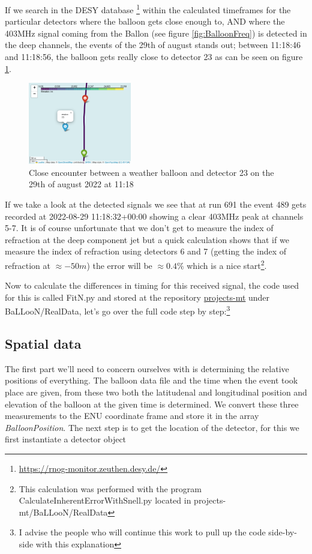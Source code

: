\documentclass[11pt,a4paper,faculty=we,language=en,doctype=report]{cls/ugent-doc}
\begin{document}
If we search in the DESY database
\footnote{\url{https://rnog-monitor.zeuthen.desy.de/}} within the calculated
timeframes for the particular detectors where the balloon gets close enough to,
AND where the 403MHz signal coming from the Ballon (see figure
\ref{fig:BalloonFreq}) is detected in the deep channels, the events of the 29th
of august stands out; between 11:18:46 and 11:18:56, the balloon gets really
close to detector 23 as can be seen on figure \ref{fig:29/08/22}.
\begin{figure}
	\centering
	\includegraphics[width=0.4\textwidth]{29-08-Encounter.png}
	\caption{Close encounter between a weather balloon and detector 23 on the 29th of august 2022 at 11:18}
	\label{fig:29/08/22}
\end{figure}
If we take a look
at the detected signals we see that at run 691 the event 489 gets recorded at
2022-08-29 11:18:32+00:00 showing a clear 403MHz peak at channels 5-7.
It is of course unfortunate that we don't get to measure the index of refraction
at the deep component jet but a quick calculation shows that if we measure the
index of refraction using detectors 6 and 7 (getting the index of refraction at $\approx -50m$) 
the error will be $\approx 0.4\%$ which is a nice start\footnote{This calculation was
performed with the program CalculateInherentErrorWithSnell.py located in projects-mt/BaLLooN/RealData}.

Now to calculate the differences in timing for this received signal, the code
used for this is called FitN.py and stored at the repository
\href{https://github.com/arthuradriaens-code/projects-mt.git}{projects-mt}
under BaLLooN/RealData, let's go over the full code step by step:\footnote{I advise 
the people who will continue this work to pull up the code side-by-side with this 
explanation}

\subsection{Spatial data}
The first part we'll need to concern ourselves with is determining the relative
positions of everything. The balloon data file and the time when the event took
place are given, from these two both the latitudenal and longitudinal position
and elevation of the balloon at the given time is determined. We convert these
three measurements to the ENU coordinate frame and store it in the array
\textit{BalloonPosition}. The next step is to get the location of the detector,
for this we first instantiate a detector object 
\end{document}
